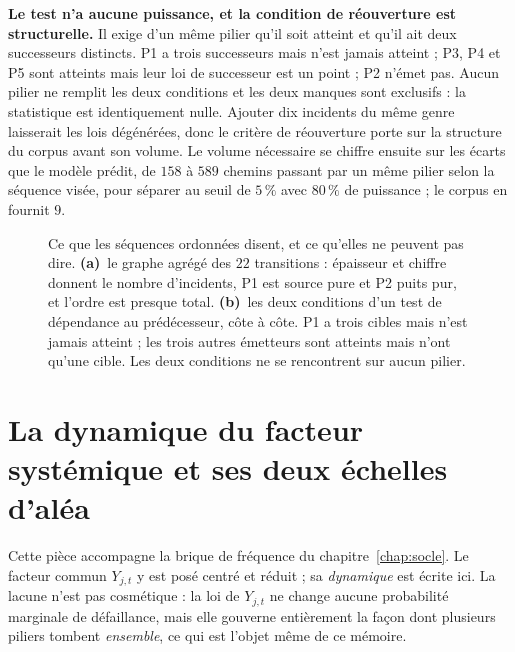 \textbf{Le test n'a aucune puissance, et la condition de réouverture est structurelle.} Il exige
d'un même pilier qu'il soit atteint et qu'il ait deux successeurs distincts. P1 a trois successeurs
mais n'est jamais atteint ; P3, P4 et P5 sont atteints mais leur loi de successeur est un point ;
P2 n'émet pas. Aucun pilier ne remplit les deux conditions et les deux manques sont exclusifs :
la statistique est identiquement nulle. Ajouter dix incidents du même genre laisserait les lois
dégénérées, donc le critère de réouverture porte sur la structure du corpus avant son volume. Le
volume nécessaire se chiffre ensuite sur les écarts que le modèle prédit, de $158$ à $589$ chemins
passant par un même pilier selon la séquence visée, pour séparer au seuil de $5\,\%$ avec $80\,\%$
de puissance ; le corpus en fournit $9$.

\begin{figure}[htbp]\centering
{}
\caption{Ce que les séquences ordonnées disent, et ce qu'elles ne peuvent pas dire.
\textbf{(a)}~le graphe agrégé des $22$ transitions : épaisseur et chiffre donnent le nombre
d'incidents, P1 est source pure et P2 puits pur, et l'ordre est presque total.
\textbf{(b)}~les deux conditions d'un test de dépendance au prédécesseur, côte à côte. P1 a trois
cibles mais n'est jamais atteint ; les trois autres émetteurs sont atteints mais n'ont qu'une
cible. Les deux conditions ne se rencontrent sur aucun pilier.}
\label{fig:sequences-ordonnees}
\end{figure}

\section{La dynamique du facteur systémique et ses deux échelles d'aléa}
\label{sec:dynamique-Y}

Cette pièce accompagne la brique de fréquence du chapitre~\ref{chap:socle}. Le facteur commun
$Y_{j,t}$ y est posé centré et réduit ; sa \emph{dynamique} est écrite ici. La lacune n'est pas cosmétique : la loi de $Y_{j,t}$ ne change aucune probabilité
marginale de défaillance, mais elle gouverne entièrement la façon dont plusieurs piliers
tombent \emph{ensemble}, ce qui est l'objet même de ce mémoire.

